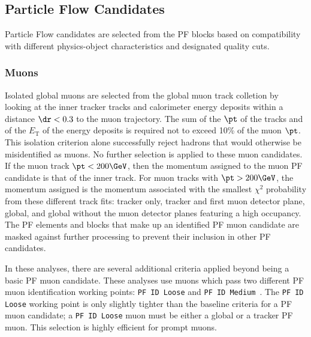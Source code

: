 \subsection{Particle Flow Candidates}
Particle Flow candidates are selected from the PF blocks based on compatibility with
different physics-object characteristics and designated quality cuts.


\subsubsection{Muons}
Isolated global muons are selected from the global muon track colletion by looking at the inner
tracker tracks and calorimeter 
energy deposits within a distance $\dr < 0.3$ to the muon trajectory. 
The sum of the $\pt$ of the tracks and of the $E_{\text{T}}$ of the energy deposits is required not to 
exceed 10\% of the muon $\pt$. This isolation criterion alone successfully reject hadrons that would
otherwise be misidentified as muons. No further selection is applied to these muon candidates.
If the muon track $\pt < 200\GeV$, then the momentum assigned to the muon PF candidate is that of 
the inner track. For muon tracks with $\pt > 200\GeV$, the momentum assigned is the momentum associated
with the smallest $\chi^2$ probability from these different track fits: tracker only, tracker and 
first muon detector plane, global, and global without the muon detector planes featuring a high occupancy.
The PF elements and blocks that make up an identified PF muon candidate are masked against further processing
to prevent their inclusion in other PF candidates.

In these analyses, there are several additional criteria applied beyond 
being a basic PF muon candidate. These analyses use muons which pass two different PF muon identification working
points: \texttt{PF ID Loose} and \texttt{PF ID Medium}~\cite{sm-htt-2017}. The \texttt{PF ID Loose}
working point is only slightly tighter than the baseline criteria for a PF muon candidate; 
a \texttt{PF ID Loose} muon must be either a global or a tracker PF muon. This selection is highly efficient
for prompt muons.

